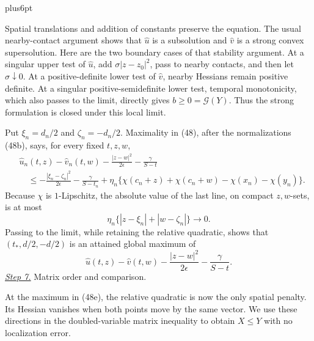 \documentclass[11pt,reqno]{amsart}
\makeatletter
\theoremstyle{plain}
\theoremstyle{definition}
\theoremstyle{remark}
\renewenvironment{proof}[1][\proofname]{%
  \par
  \pushQED{\qed}%
  \normalfont
  \topsep6pt plus6pt\relax
  \trivlist
  \item[\hskip\labelsep\slshape #1\@addpunct{.}]%
  \ignorespaces
}{%
  \popQED
  \endtrivlist
  \@endpefalse
}
\DeclareRobustCommand{\qed}{%
  \leavevmode\unskip\penalty9999\hbox{}\nobreak
  \ifmmode
    \makebox[0pt][l]{\qquad\hbox{\qedsymbol}}%
  \else
    \qquad\hbox{\qedsymbol}%
  \fi
}
\renewcommand{\qedsymbol}{\rule[.47pt]{4pt}{6pt}}
\numberwithin{equation}{section}
\newcommand{\1}{\mathbf 1}
\makeatother
\begin{document}
\begin{proof}
Spatial translations and addition of constants preserve the equation.
The usual nearby-contact argument shows that $\widehat u$ is a
subsolution and $\widehat v$ is a strong convex supersolution.  Here
are the two boundary cases of that stability argument.  At a singular
upper test of $\widehat u$, add
$\sigma|z-z_ 0|^2$, pass to nearby contacts, and then let
$\sigma\downarrow0$.  At a positive-definite lower test of
$\widehat v$, nearby Hessians remain positive definite.  At a
singular positive-semidefinite lower test, temporal monotonicity,
which also passes to the limit, directly gives
$b\geq0=\mathcal G(Y)$.  Thus the strong formulation is closed under this
local limit.

Put $\xi_ n=d_ n/2$ and $\zeta_ n=-d_ n/2$.  Maximality in (48),
after the normalizations (48b), says, for every fixed $t,z,w$,
\begin{equation}
\begin{split}
&\widehat u_ n(t,z)-\widehat v_ n(t,w)
-\frac{|z-w|^2}{2\epsilon}-\frac{\gamma}{S-t}\\
&\quad\leq
-\frac{|\xi_ n-\zeta_ n|^2}{2\epsilon}
-\frac{\gamma}{S-t_ n}
+\eta_ n\{\chi(c_ n+z)+\chi(c_ n+w)
-\chi(x_ n)-\chi(y_ n)\}.                         
\end{split}
\tag{48c}
\end{equation}
Because $\chi$ is $1$-Lipschitz, the absolute value of the last
line, on compact $z,w$-sets, is at most
\begin{equation}
\eta_ n\{|z-\xi_ n|+|w-\zeta_ n|\}\longrightarrow0.
\tag{48d}
\end{equation}
Passing to the limit, while retaining the relative quadratic, shows
that $(t_ *,d/2,-d/2)$ is an attained global maximum of
\begin{equation}
\widehat u(t,z)-\widehat v(t,w)
-\frac{|z-w|^2}{2\epsilon}-\frac{\gamma}{S-t}.
\tag{48e}
\end{equation}
\smallskip\noindent
\underline{\textit{Step 7.}} Matrix order and comparison.

At the maximum in (48e), the relative quadratic is now the only
spatial penalty.  Its Hessian vanishes when both points move by the
same vector.  We use these directions in the doubled-variable matrix
inequality to obtain $X\leq Y$ with no localization error.


\end{proof}
\end{document}
